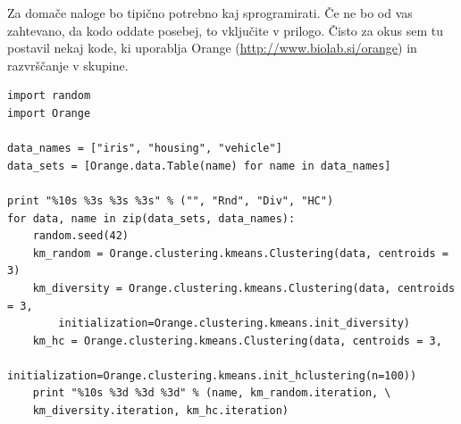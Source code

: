 \documentclass[a4paper,11pt]{article}
\begin{document}
Za domače naloge bo tipično potrebno kaj sprogramirati. Če ne bo od
vas zahtevano, da kodo oddate posebej, to vključite v prilogo. Čisto
za okus sem tu postavil nekaj kode, ki uporablja Orange
(\url{http://www.biolab.si/orange}) in razvrščanje v skupine.


\begin{lstlisting}
import random
import Orange

data_names = ["iris", "housing", "vehicle"]
data_sets = [Orange.data.Table(name) for name in data_names]

print "%10s %3s %3s %3s" % ("", "Rnd", "Div", "HC")
for data, name in zip(data_sets, data_names):
    random.seed(42)
    km_random = Orange.clustering.kmeans.Clustering(data, centroids = 3)
    km_diversity = Orange.clustering.kmeans.Clustering(data, centroids = 3,
        initialization=Orange.clustering.kmeans.init_diversity)
    km_hc = Orange.clustering.kmeans.Clustering(data, centroids = 3,
        initialization=Orange.clustering.kmeans.init_hclustering(n=100))
    print "%10s %3d %3d %3d" % (name, km_random.iteration, \
    km_diversity.iteration, km_hc.iteration)
\end{lstlisting}
\end{document}

